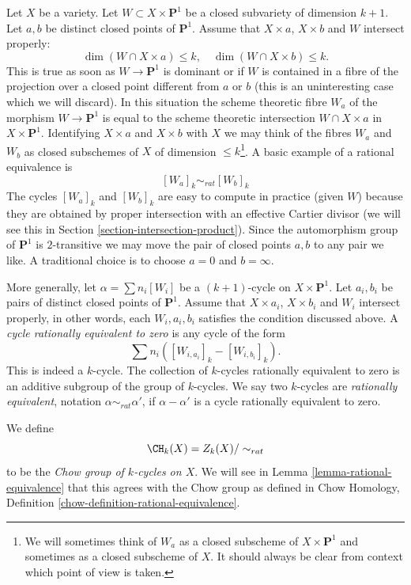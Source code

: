 \medskip\noindent
Let $X$ be a variety. Let $W \subset X \times \mathbf{P}^1$
be a closed subvariety of dimension $k + 1$. Let $a, b$ be distinct closed
points of $\mathbf{P}^1$. Assume that $X \times a$, $X \times b$ and $W$
intersect properly:
$$
\dim (W \cap X \times a) \leq k,\quad
\dim (W \cap X \times b) \leq k.
$$
This is true as soon as $W \to \mathbf{P}^1$ is dominant or if $W$ is
contained in a fibre of the projection over a closed point different from
$a$ or $b$ (this is an uninteresting case which we will discard). In this
situation the scheme theoretic fibre $W_a$ of the morphism
$W \to \mathbf{P}^1$ is equal to the scheme theoretic intersection
$W \cap X \times a$ in $X \times \mathbf{P}^1$. Identifying $X \times a$
and $X \times b$ with $X$ we may think of the fibres $W_a$ and $W_b$
as closed subschemes of $X$ of dimension $\leq k$\footnote{We will sometimes
think of $W_a$ as a closed subscheme of $X \times \mathbf{P}^1$ and sometimes
as a closed subscheme of $X$. It should always be clear from context which
point of view is taken.}. A basic example of a
rational equivalence is
$$
[W_a]_k \sim_{rat} [W_b]_k
$$
The cycles $[W_a]_k$ and $[W_b]_k$ are easy to compute in practice
(given $W$) because they are obtained by proper intersection with
an effective Cartier divisor (we will see this in
Section \ref{section-intersection-product}).
Since the automorphism group of $\mathbf{P}^1$ is $2$-transitive we may
move the pair of closed points $a, b$ to any pair we like. A traditional
choice is to choose $a = 0$ and $b = \infty$.

\medskip\noindent
More generally, let $\alpha = \sum n_i [W_i]$ be a $(k + 1)$-cycle on
$X \times \mathbf{P}^1$.  Let $a_i, b_i$ be pairs of distinct closed points of
$\mathbf{P}^1$. Assume that $X \times a_i$, $X \times b_i$ and $W_i$ intersect
properly, in other words, each $W_i, a_i, b_i$ satisfies the condition
discussed above. A {\it cycle rationally equivalent to zero} is any cycle
of the form
$$
\sum n_i([W_{i, a_i}]_k - [W_{i, b_i}]_k).
$$
This is indeed a $k$-cycle. The collection of $k$-cycles rationally
equivalent to zero is an additive subgroup of the group of $k$-cycles.
We say two $k$-cycles are {\it rationally equivalent}, notation
$\alpha \sim_{rat} \alpha'$, if $\alpha - \alpha'$ is a cycle rationally
equivalent to zero.

\medskip\noindent
We define
$$
\CH_k(X) = Z_k(X)/ \sim_{rat}
$$
to be the {\it Chow group of $k$-cycles on $X$}. We will see in
Lemma \ref{lemma-rational-equivalence}
that this agrees with the Chow group as defined in
Chow Homology, Definition \ref{chow-definition-rational-equivalence}.


